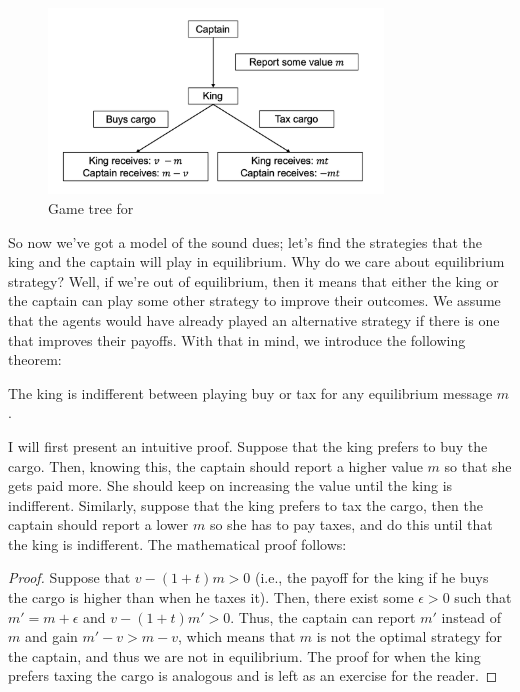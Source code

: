 \begin{figure}[H]
    \caption{Game tree for \citet{Haan_2012_Taxation}}
    \centering
    \includegraphics[width = 3.5in]{taxgamertree.png}
\end{figure}

So now we've got a model of the sound dues; let's find the strategies that the king and the captain will play in equilibrium. Why do we care about equilibrium strategy? Well, if we're out of equilibrium, then it means that either the king or the captain can play some other strategy to improve their outcomes. We assume that the agents would have already played an alternative strategy if there is one that improves their payoffs. With that in mind, we introduce the following theorem:

\begin{theorem}
    The king is indifferent between playing buy or tax for any equilibrium message $m$.
\end{theorem}
I will first present an intuitive proof. Suppose that the king prefers to buy the cargo. Then, knowing this, the captain should report a higher value $m$ so that she gets paid more. She should keep on increasing the value until the king is indifferent. Similarly, suppose that the king prefers to tax the cargo, then the captain should report a lower $m$ so she has to pay taxes, and do this until that the king is indifferent. The mathematical proof follows:
\begin{proof}
    Suppose that $v - (1 + t)m > 0$ (i.e., the payoff for the king if he buys the cargo is higher than when he taxes it). Then, there exist some $\epsilon > 0$ such that $m' = m + \epsilon$ and $v - (1 + t)m' > 0$. Thus, the captain can report $m'$ instead of $m$ and gain $m'-v > m - v$, which means that $m$ is not the optimal strategy for the captain, and thus we are not in equilibrium. The proof for when the king prefers taxing the cargo is analogous and is left as an exercise for the reader. 
\end{proof}

